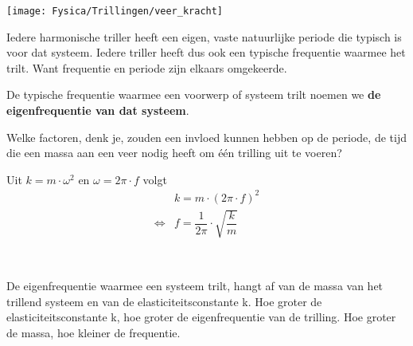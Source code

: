 \documentclass{ximera}
\begin{document}
\begin{image}[0.5\textwidth]
    \texttt{[image: Fysica/Trillingen/veer\_kracht]}
\end{image}


Iedere harmonische triller heeft een eigen, vaste natuurlijke periode die typisch is voor dat systeem. Iedere triller heeft dus ook een typische frequentie waarmee het trilt. Want frequentie en periode zijn elkaars omgekeerde.

De typische frequentie waarmee een voorwerp of systeem trilt noemen we \textbf{de eigenfrequentie van dat systeem}.

\begin{example}
Welke factoren, denk je, zouden een invloed kunnen hebben op de periode, de tijd die een massa aan een veer nodig heeft om één trilling uit te voeren?
\end{example}

Uit $k=m\cdot \omega^2$  en $\omega=2\pi\cdot f$ volgt
\begin{align*}
    &k=m\cdot(2\pi\cdot f)^2 \\
    \Leftrightarrow & f=\dfrac{1}{2\pi}\cdot \sqrt{\dfrac{k}{m}}
\end{align*}

\begin{definition}
      \ \\
    \begin{center}
    \end{center}
\end{definition}

De eigenfrequentie waarmee een systeem trilt, hangt af van de massa van het trillend systeem en van de elasticiteitsconstante k. Hoe groter de elasticiteitsconstante k, hoe groter de eigenfrequentie  van de trilling. Hoe groter de massa, hoe kleiner de frequentie.
\end{document}
